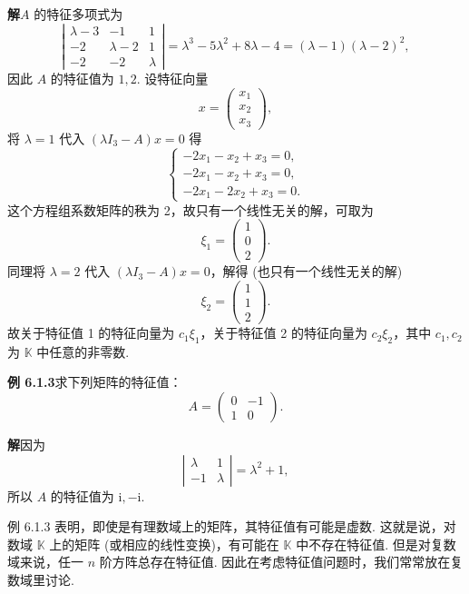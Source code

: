 \documentclass[UTF8, 12pt, fontset=fandol, oneside]{ctexart}
\begin{document}
\noindent\textbf{解}\quad $A$ 的特征多项式为
\[
\left|\begin{array}{ccc}
\lambda-3 & -1 & 1\\
-2 & \lambda-2 & 1\\
-2 & -2 & \lambda
\end{array}\right|
=\lambda^3-5\lambda^2+8\lambda-4=(\lambda-1)(\lambda-2)^2,
\]
因此 $A$ 的特征值为 $1,2$. 设特征向量
\[
x=\left(\begin{array}{c}
x_1\\
x_2\\
x_3
\end{array}\right),
\]
将 $\lambda=1$ 代入 $(\lambda I_3-A)x=0$ 得
\[
\left\{\begin{array}{l}
-2x_1-x_2+x_3=0,\\
-2x_1-x_2+x_3=0,\\
-2x_1-2x_2+x_3=0.
\end{array}\right.
\]
这个方程组系数矩阵的秩为 2，故只有一个线性无关的解，可取为
\[
\xi_1=\left(\begin{array}{c}
1\\
0\\
2
\end{array}\right).
\]
同理将 $\lambda=2$ 代入 $(\lambda I_3-A)x=0$，解得 (也只有一个线性无关的解)
\[
\xi_2=\left(\begin{array}{c}
1\\
1\\
2
\end{array}\right).
\]
故关于特征值 1 的特征向量为 $c_1\xi_1$，关于特征值 2 的特征向量为 $c_2\xi_2$，其中 $c_1,c_2$ 为 $\mathbb{K}$ 中任意的非零数.

\noindent\textbf{例 6.1.3}\quad 求下列矩阵的特征值：
\[
A=\left(\begin{array}{cc}
0 & -1\\
1 & 0
\end{array}\right).
\]

\noindent\textbf{解}\quad 因为
\[
\left|\begin{array}{cc}
\lambda & 1\\
-1 & \lambda
\end{array}\right|=\lambda^2+1,
\]
所以 $A$ 的特征值为 $\mathrm{i},-\mathrm{i}$.

例 6.1.3 表明，即使是有理数域上的矩阵，其特征值有可能是虚数. 这就是说，对数域 $\mathbb{K}$ 上的矩阵 (或相应的线性变换)，有可能在 $\mathbb{K}$ 中不存在特征值. 但是对复数域来说，任一 $n$ 阶方阵总存在特征值. 因此在考虑特征值问题时，我们常常放在复数域里讨论.
\end{document}
